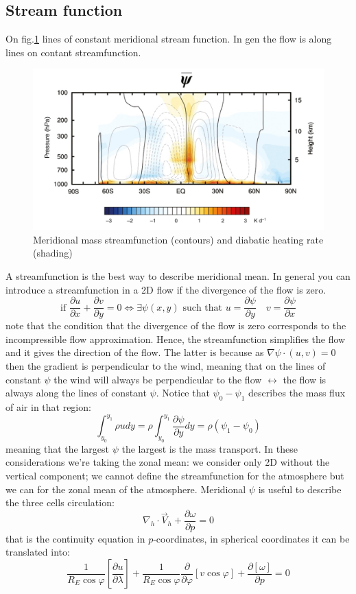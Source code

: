 \subsection{Stream function}
On fig.\ref{fig:meridional streamf} lines of constant meridional stream function. In gen the flow is along lines on contant streamfunction. 
\begin{figure}[h]
    \centering
    \includegraphics[width=0.5\linewidth]{uploads/streamf.png}
    \caption{Meridional mass streamfunction (contours) and diabatic heating rate (shading)}
    \label{fig:meridional streamf}
\end{figure}
A streamfunction is the best way to describe meridional mean. In general you can introduce a streamfunction in a 2D flow if the divergence of the flow is zero.
\[\text{if }\frac{\partial u}{\partial x}+\frac{\partial v}{\partial y}=0\Leftrightarrow \exists \psi(x,y)\text{ such that } u=\frac{\partial\psi}{\partial y}\quad v=\frac{\partial\psi}{\partial x}\]
note that the condition that the divergence of the flow is zero corresponds to the incompressible flow approximation. Hence, the streamfunction simplifies the flow and it gives the direction of the flow. The latter is because as $\nabla\psi\cdot(u,v)=0$ then the gradient is perpendicular to the wind, meaning that on the lines of constant $\psi$ the wind will always be perpendicular to the flow $\leftrightarrow$ the flow is always along the lines of constant $\psi$.
Notice that $\psi_0-\psi_1$ describes the mass flux of air in that region:
\[\int_{y_0}^{y_1}\rho udy=\rho\int_{y_0}^{y_1}\frac{\partial\psi}{\partial y}dy=\rho(\psi_1-\psi_0)\]
meaning that the largest $\psi$ the largest is the mass transport. In these considerations we're taking the zonal mean: we consider only 2D without the vertical component; we cannot define the streamfunction for the atmosphere but we can for the zonal mean of the atmosphere. Meridional $\psi$ is useful to describe the three cells circulation:
\[\nabla_h\cdot\vec{V}_h+\frac{\partial\omega}{\partial p}=0\] that is the continuity equation in $p$-coordinates, in spherical coordinates it can be translated into:
\[\frac{1}{R_E\cos\varphi}\left[\frac{\partial u}{\partial\lambda}\right]+\frac{1}{R_E\cos\varphi}\frac{\partial}{\partial\varphi}\left[v\cos\varphi\right]+\frac{\partial[\omega]}{\partial p}=0\]
